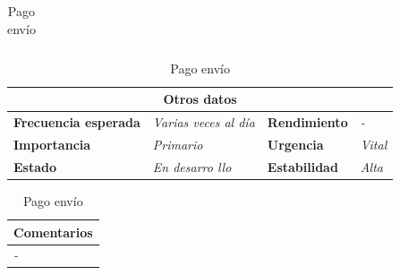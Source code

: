 \documentclass[12pt,spanish]{article}
\begin{document}
\begin{table}[H]
\begin{tabular}{|m{5pt}|m{7.33cm}|m{5pt}|m{7.33cm}|}
	\end{tabular}
	
	\vspace{0.5cm}
	
	\begin{tabular}{|m{3.75cm}|m{3.75cm}|m{3.75cm}|m{3.8cm}|}
		\hline
		\multicolumn{4}{|c|}{\textbf{Otros datos}} \\
		\hline
		\textbf{Frecuencia esperada} & \textit{Varias veces al día} & \textbf{Rendimiento} & \textit{-} \\
		\hline
		\textbf{Importancia} & \textit{Primario} & \textbf{Urgencia} & \textit{Vital} \\
		\hline
		\textbf{Estado} & \textit{En desarro
		llo} & \textbf{Estabilidad} & \textit{Alta} \\
		\hline
	\end{tabular}
	
	\vspace{1cm}
	
	\begin{tabular}{|m{16.2cm}|}
		\hline
		\textbf{Comentarios} \\
		\hline
		\textit{-} \\
		\hline
	\end{tabular}
	
	\caption{Pago envío}
	
\end{table}
\end{document}
